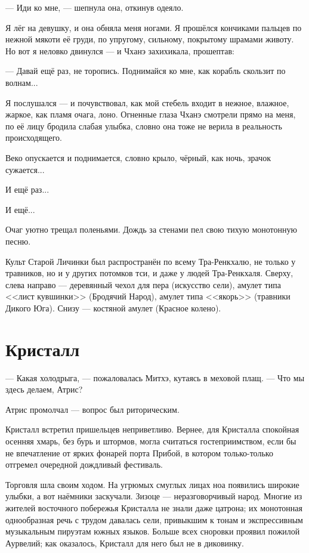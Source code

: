 --- Иди ко мне, --- шепнула она, откинув одеяло.

Я лёг на девушку, и она обняла меня ногами.
Я прошёлся кончиками пальцев по нежной мякоти её груди, по упругому, сильному, покрытому шрамами животу.
Но вот я неловко двинулся --- и Чханэ захихикала, прошептав:

--- Давай ещё раз, не торопись.
Поднимайся ко мне, как корабль скользит по волнам...

Я послушался --- и почувствовал, как мой стебель входит в нежное, влажное, жаркое, как пламя очага, лоно.
Огненные глаза Чханэ смотрели прямо на меня, по её лицу бродила слабая улыбка, словно она тоже не верила в реальность происходящего.

Веко опускается и поднимается, словно крыло, чёрный, как ночь, зрачок сужается...

И ещё раз...

И ещё...

Очаг уютно трещал поленьями.
Дождь за стенами пел свою тихую монотонную песню.


\newpage
\thispagestyle{plain}

Культ Старой Личинки был распространён по всему Тра-Ренкхалю, не только у травников, но и у других потомков тси, и даже у людей Тра-Ренкхаля.
Сверху, слева направо --- деревянный чехол для пера (искусство сели), амулет типа <<лист кувшинки>> (Бродячий Народ), амулет типа <<якорь>> (травники Дикого Юга).
Снизу --- костяной амулет (Красное колено).
\newpage

\section{Кристалл}

--- Какая холодрыга, --- пожаловалась Митхэ, кутаясь в меховой плащ.
--- Что мы здесь делаем, Атрис?

Атрис промолчал --- вопрос был риторическим.

Кристалл встретил пришельцев неприветливо. Вернее, для Кристалла спокойная осенняя хмарь, без бурь и штормов, могла считаться гостеприимством, если бы не впечатление от
ярких фонарей порта Прибой, в котором только-только отгремел очередной дождливый фестиваль.

Торговля шла своим ходом.
На угрюмых смуглых лицах ноа появились широкие улыбки, а вот наёмники заскучали.
Зизоце --- неразговорчивый народ.
Многие из жителей восточного побережья Кристалла не знали даже цатрона;
их монотонная однообразная речь с трудом давалась сели, привыкшим к тонам и экспрессивным музыкальным пируэтам южных языков.
Больше всех сноровки проявил пожилой Аурвелий;
как оказалось, Кристалл для него был не в диковинку.


